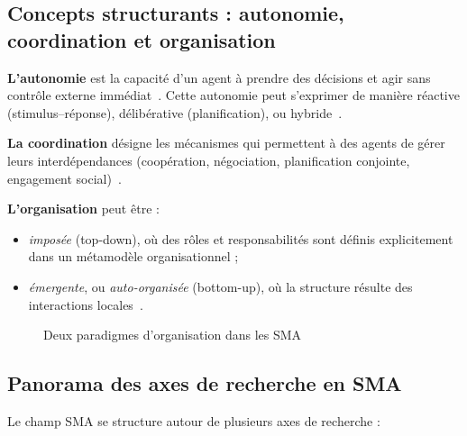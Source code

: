 \documentclass[ twoside,openright,titlepage,numbers=noenddot,headinclude,%
                footinclude=true,cleardoublepage=empty,abstractoff, %
                BCOR=5mm,paper=a4,fontsize=11pt,%
                french,american,%
                ]{scrreprt}
\begin{document}
\subsection*{Concepts structurants : autonomie, coordination et organisation}

\textbf{L'autonomie} est la capacité d’un agent à prendre des décisions et agir sans contrôle externe immédiat~\cite{Russell2010}. Cette autonomie peut s’exprimer de manière réactive (stimulus–réponse), délibérative (planification), ou hybride~\cite{Georgeff1999}.

\textbf{La coordination} désigne les mécanismes qui permettent à des agents de gérer leurs interdépendances (coopération, négociation, planification conjointe, engagement social)~\cite{Durfee1999,Jennings1996,Sandholm1999}.

\textbf{L’organisation} peut être :
\begin{itemize}
    \item \emph{imposée} (top-down), où des rôles et responsabilités sont définis explicitement dans un métamodèle organisationnel ;
    \item \emph{émergente}, ou \emph{auto-organisée} (bottom-up), où la structure résulte des interactions locales~\cite{Heylighen2001,DiMarzoSerugendo2005}.
\end{itemize}

\begin{figure}[h]
    \centering
    \caption{Deux paradigmes d'organisation dans les SMA}
    \label{fig:auto_vs_topdown}
\end{figure}

\subsection*{Panorama des axes de recherche en SMA}

Le champ SMA se structure autour de plusieurs axes de recherche :
\end{document}
